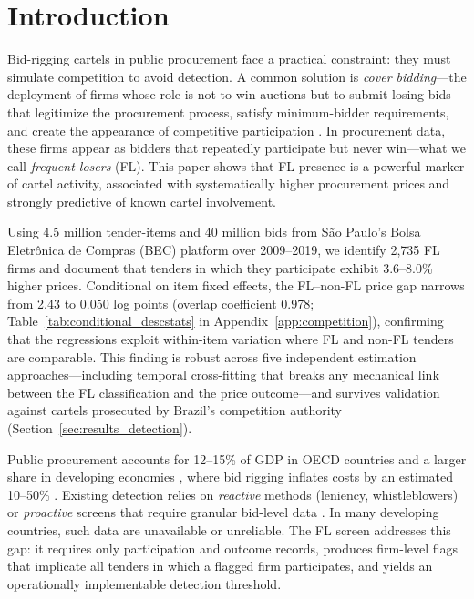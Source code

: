 \section{Introduction}
\label{sec:intro}

Bid-rigging cartels in public procurement face a practical constraint:
they must simulate competition to avoid detection. A common solution is
\emph{cover bidding}---the deployment of firms whose role is not to win
auctions but to submit losing bids that legitimize the procurement
process, satisfy minimum-bidder requirements, and create the appearance
of competitive participation
\citep{marshall2012economics, asker2010leniency}. In procurement data,
these firms appear as bidders that repeatedly participate but never
win---what we call \emph{frequent losers} (FL). This paper shows that
FL presence is a powerful marker of cartel activity, associated with
systematically higher procurement prices and strongly predictive of
known cartel involvement.

Using 4.5 million tender-items and 40 million bids from S\~ao Paulo's
Bolsa Eletr\^onica de Compras (BEC) platform over 2009--2019, we
identify 2,735 FL firms and document that tenders in which they
participate exhibit 3.6--8.0\% higher prices. Conditional on item
fixed effects, the FL--non-FL price gap narrows from 2.43 to 0.050
log points (overlap coefficient 0.978;
Table~\ref{tab:conditional_descstats} in
Appendix~\ref{app:competition}), confirming that the regressions
exploit within-item variation where FL and non-FL tenders are
comparable. This finding is robust across five independent
estimation approaches---including temporal cross-fitting that breaks
any mechanical link between the FL classification and the price
outcome---and survives validation against cartels prosecuted by
Brazil's competition authority
(Section~\ref{sec:results_detection}).

Public procurement accounts for 12--15\% of GDP in OECD countries and
a larger share in developing economies \citep{oecd2019government}, where
bid rigging inflates costs by an estimated 10--50\%
\citep{connor2007price}. Existing detection relies on \emph{reactive}
methods (leniency, whistleblowers) or \emph{proactive} screens that
require granular bid-level data \citep{harrington2008detecting,
imhof2019detecting}. In many developing countries, such data are
unavailable or unreliable. The FL screen addresses this gap: it requires
only participation and outcome records, produces firm-level flags that
implicate all tenders in which a flagged firm participates, and yields
an operationally implementable detection threshold.

